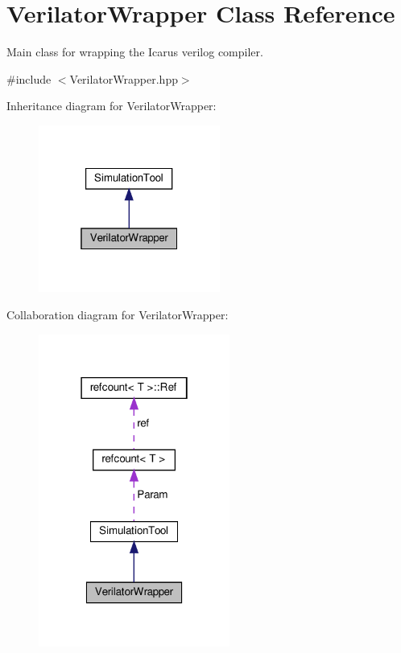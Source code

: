 \hypertarget{classVerilatorWrapper}{}\section{Verilator\+Wrapper Class Reference}
\label{classVerilatorWrapper}


Main class for wrapping the Icarus verilog compiler.  




{\ttfamily \#include $<$Verilator\+Wrapper.\+hpp$>$}



Inheritance diagram for Verilator\+Wrapper\+:
\nopagebreak
\begin{figure}[H]
\begin{center}
\leavevmode
\includegraphics[width=169pt]{d4/d64/classVerilatorWrapper__inherit__graph}
\end{center}
\end{figure}


Collaboration diagram for Verilator\+Wrapper\+:
\nopagebreak
\begin{figure}[H]
\begin{center}
\leavevmode
\includegraphics[width=178pt]{d6/d82/classVerilatorWrapper__coll__graph}
\end{center}
\end{figure}
